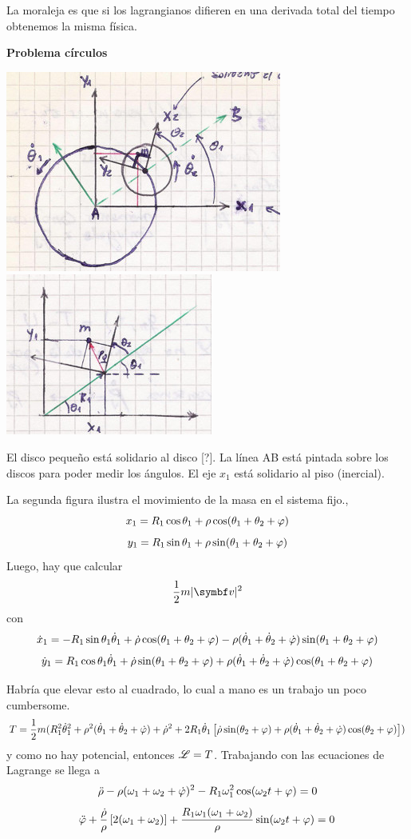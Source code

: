 \documentclass[10pt,oneside]{CBFT_book}
\begin{document}
La moraleja es que si los lagrangianos difieren en una derivada total del tiempo obtenemos la misma
física.

\begin{ejemplo}{\bf Problema círculos}

\includegraphics[scale=0.3]{images/fig_mc_dos_circulos_rotantes.jpg} 
\includegraphics[scale=0.3]{images/fig_mc_dos_circulos_subsistema.jpg} 
 
El disco pequeño está solidario al disco [?]. La línea AB está pintada sobre los discos para poder medir los ángulos.
El eje $x_1$ está solidario al piso (inercial).

La segunda figura ilustra el movimiento de la masa en el sistema fijo.,
\[
	x_1 = R_1 \cos \theta_1 + \rho \cos ( \theta_1 + \theta_2 + \varphi )
\]
\[
	y_1 = R_1 \sin \theta_1 + \rho \sin ( \theta_1 + \theta_2 + \varphi )
\]
Luego, hay que calcular 
\[
	\frac 1 2 m |\vb{v}|^2
\]
con 
\[
	\dot{x}_1 = -R_1 \sin \theta_1 \dot{\theta}_1 + \dot{\rho} \cos ( \theta_1 + \theta_2 + \varphi ) -
	\rho ( \dot{\theta}_1 + \dot{\theta}_2 + \dot{\varphi} ) \sin( \theta_1 + \theta_2 + \varphi )
\]
\[
	\dot{y}_1 = R_1 \cos \theta_1 \dot{\theta}_1 + \dot{\rho} \sin ( \theta_1 + \theta_2 + \varphi ) +
	\rho ( \dot{\theta}_1 + \dot{\theta}_2 + \dot{\varphi} ) \cos( \theta_1 + \theta_2 + \varphi )	
\]

Habría que elevar esto al cuadrado, lo cual a mano es un trabajo un poco cumbersome.
\[
	T = \frac 1 2 m ( R_1^2 \dot{\theta}_1^2 + \rho^2( \dot{\theta}_1 + \dot{\theta}_2  + \dot{\varphi} ) + \dot{\rho}^2 + 
	2R_1\dot{\theta}_1\left[ \dot{\rho}\sin(\theta_2+\varphi) + \rho( \dot{\theta}_1 + \dot{\theta}_2 + \dot{\varphi} )\cos(\theta_2+\varphi) \right])
\]
y como no hay potencial, entonces $\mathscr{L} = T $. Trabajando con las ecuaciones de Lagrange se llega a
\[
	\ddot{\rho} - \rho ( \omega_1 + \omega_2 + \dot{\varphi} )^2 - R_1 \omega_1^2 \cos (\omega_2 t + \varphi ) = 0
\]
\[
	\ddot{\varphi} + \frac{\dot{\rho}}{\rho}\left[ 2(\omega_1 + \omega_2 )\right] + 
	\frac{R_1\omega_1( \omega_1 + \omega_2 )}{\rho} \sin (\omega_2 t + \varphi ) = 0
\]


\end{ejemplo}
\end{document}
